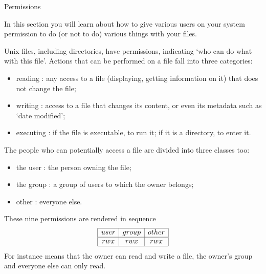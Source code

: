  {Permissions}

\begin{purpose}
  In this section you will learn about how to give various users on
  your system permission to do (or not to do) various things with your
  files.
\end{purpose}

Unix files, including directories,
have permissions, indicating `who can do what with this
file'. Actions that can be performed on a file fall into three
categories:
\begin{itemize}
\item reading : any access to a file (displaying, getting information
  on it) that does not change the file;
\item writing : access to a file that changes its content, or even its
  metadata such as `date modified';
\item executing : if the file is executable, to run it; if it is a
  directory, to enter it.
\end{itemize}
The people who can potentially access a file are divided into three
classes too:
\begin{itemize}
\item the user : the person owning the file;
\item the group : a group of users to which the owner belongs;
\item other : everyone else.
\end{itemize}
These nine permissions are rendered in sequence
\[ \begin{array}{|c|c|c|}
  \hline user&group&other\\ \hline rwx&rwx&rwx \\ \hline
\end{array}
\]
For instance
 means that the owner can read and write a file, the owner's
group and everyone else can only read. 

